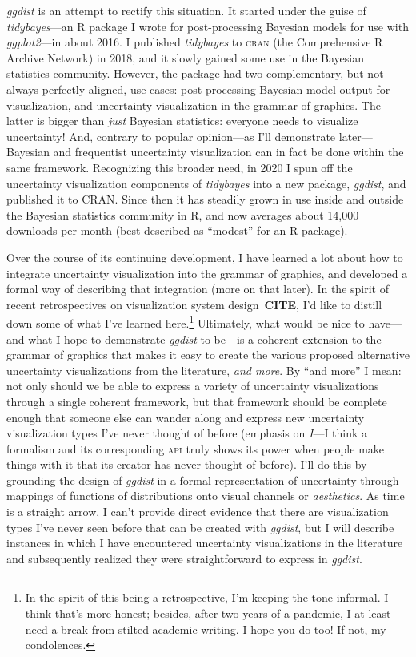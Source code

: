 \documentclass[journal]{vgtc}                     %
\begin{document}
\textit{ggdist} is an attempt to rectify this situation. It started under the guise of \textit{tidybayes}---an R package I wrote for post-processing Bayesian models for use with \textit{ggplot2}---in about 2016. I published \textit{tidybayes} to \textsc{cran} (the Comprehensive R Archive Network) in 2018, and it slowly gained some use in the Bayesian statistics community. However, the package had two complementary, but not always perfectly aligned, use cases: post-processing Bayesian model output for visualization, and uncertainty visualization in the grammar of graphics. The latter is bigger than \textit{just} Bayesian statistics: everyone needs to visualize uncertainty! And, contrary to popular opinion---as I'll demonstrate later---Bayesian and frequentist uncertainty visualization can in fact be done within the same framework. Recognizing this broader need, in 2020 I spun off the uncertainty visualization components of \textit{tidybayes} into a new package, \textit{ggdist}, and published it to CRAN. Since then it has steadily grown in use inside and outside the Bayesian statistics community in R, and now averages about 14,000 downloads per month (best described as ``modest'' for an R package).

Over the course of its continuing development, I have learned a lot about how to integrate uncertainty visualization into the grammar of graphics, and developed a formal way of describing that integration (more on that later). In the spirit of recent retrospectives on visualization system design~\textbf{CITE}, I'd like to distill down some of what I've learned here.\footnote{In the spirit of this being a retrospective, I'm keeping the tone informal. I think that's more honest; besides, after two years of a pandemic, I at least need a break from stilted academic writing. I hope you do too! If not, my condolences.} Ultimately, what would be nice to have---and what I hope to demonstrate \textit{ggdist} to be---is a coherent extension to the grammar of graphics that makes it easy to create the various proposed alternative uncertainty visualizations from the literature, \textit{and more}. By  ``and more'' I mean: not only should we be able to express a variety of uncertainty visualizations through a single coherent framework, but that framework should be complete enough that someone else can wander along and express new uncertainty visualization types I've never thought of before (emphasis on \textit{I}---I think a formalism and its corresponding \textsc{api} truly shows its power when people make things with it that its creator has never thought of before). I'll do this by grounding the design of \textit{ggdist} in a formal representation of uncertainty through mappings of functions of distributions onto visual channels or \textit{aesthetics}. As time is a straight arrow, I can't provide direct evidence that there are visualization types I've never seen before that can be created with \textit{ggdist}, but I will describe instances in which I have encountered uncertainty visualizations in the literature and subsequently realized they were straightforward to express in \textit{ggdist}.
\end{document}
